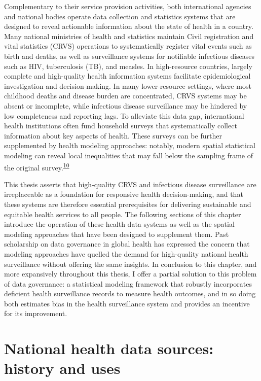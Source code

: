 \documentclass[
]{article}
\begin{document}
Complementary to their service provision activities, both international agencies and national bodies operate data collection and statistics systems that are designed to reveal actionable information about the state of health in a country. Many national ministries of health and statistics maintain Civil registration and vital statistics (CRVS) operations to systematically register vital events such as birth and deaths, as well as surveillance systems for notifiable infectious diseases such as HIV, tuberculosis (TB), and measles. In high-resource countries, largely complete and high-quality health information systems facilitate epidemiological investigation and decision-making. In many lower-resource settings, where most childhood deaths and disease burden are concentrated, CRVS systems may be absent or incomplete, while infectious disease surveillance may be hindered by low completeness and reporting lags. To alleviate this data gap, international health institutions often fund household surveys that systematically collect information about key aspects of health. These surveys can be further supplemented by health modeling approaches: notably, modern spatial statistical modeling can reveal local inequalities that may fall below the sampling frame of the original survey.\textsuperscript{\protect\hyperlink{ref-Diggle2016}{10}}

This thesis asserts that high-quality CRVS and infectious disease surveillance are irreplaceable as a foundation for responsive health decision-making, and that these systems are therefore essential prerequisites for delivering sustainable and equitable health services to all people. The following sections of this chapter introduce the operation of these health data systems as well as the spatial modeling approaches that have been designed to supplement them. Past scholarship on data governance in global health has expressed the concern that modeling approaches have quelled the demand for high-quality national health surveillance without offering the same insights. In conclusion to this chapter, and more expansively throughout this thesis, I offer a partial solution to this problem of data governance: a statistical modeling framework that robustly incorporates deficient health surveillance records to measure health outcomes, and in so doing both estimates bias in the health surveillance system and provides an incentive for its improvement.

\hypertarget{national-health-data-sources-history-and-uses}{%
\section{National health data sources: history and uses}\label{national-health-data-sources-history-and-uses}}
\end{document}
